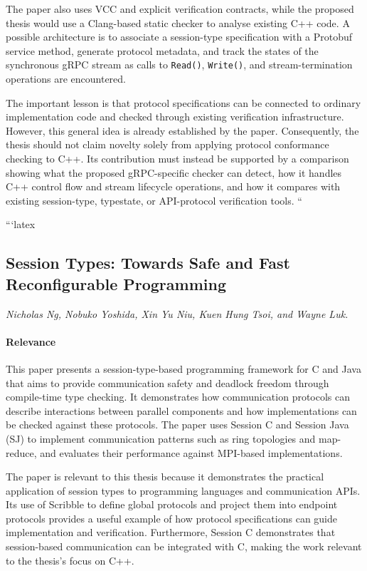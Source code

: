 The paper also uses VCC and explicit verification contracts, while the proposed thesis would use a Clang-based static checker to analyse existing C++ code. A possible architecture is to associate a session-type specification with a Protobuf service method, generate protocol metadata, and track the states of the synchronous gRPC stream as calls to \texttt{Read()}, \texttt{Write()}, and stream-termination operations are encountered.

The important lesson is that protocol specifications can be connected to ordinary implementation code and checked through existing verification infrastructure. However, this general idea is already established by the paper. Consequently, the thesis should not claim novelty solely from applying protocol conformance checking to C++. Its contribution must instead be supported by a comparison showing what the proposed gRPC-specific checker can detect, how it handles C++ control flow and stream lifecycle operations, and how it compares with existing session-type, typestate, or API-protocol verification tools.
``


```latex
\subsection{Session Types: Towards Safe and Fast Reconfigurable Programming}
\textit{Nicholas Ng, Nobuko Yoshida, Xin Yu Niu, Kuen Hung Tsoi, and Wayne Luk.}

\paragraph{Relevance}
This paper presents a session-type-based programming framework for C and Java that aims to provide communication safety and deadlock freedom through compile-time type checking. It demonstrates how communication protocols can describe interactions between parallel components and how implementations can be checked against these protocols. The paper uses Session C and Session Java (SJ) to implement communication patterns such as ring topologies and map-reduce, and evaluates their performance against MPI-based implementations.

The paper is relevant to this thesis because it demonstrates the practical application of session types to programming languages and communication APIs. Its use of Scribble to define global protocols and project them into endpoint protocols provides a useful example of how protocol specifications can guide implementation and verification. Furthermore, Session C demonstrates that session-based communication can be integrated with C, making the work relevant to the thesis's focus on C++.

